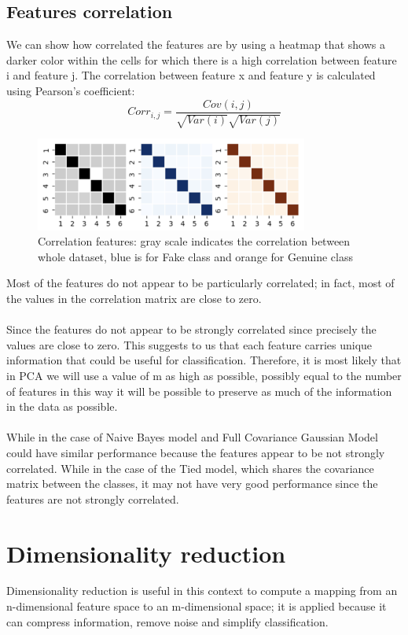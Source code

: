 \documentclass{article}
\begin{document}
\subsection{Features correlation}
We can show how correlated the features are by using a heatmap that shows a darker color within the cells for which there is a high correlation between feature i and feature j. The correlation between feature x and feature y is calculated using Pearson's coefficient:
\begin{equation}
    Corr_{i,j} = \frac{Cov(i,j)}{\sqrt{Var(i)}\sqrt{Var(j)}}  
\end{equation}
\begin{figure}[H]
    \centering
    \includegraphics[width=0.8\textwidth]{./img/correlazione.png}
    \caption{Correlation features: gray scale indicates the correlation between whole dataset, blue is for Fake class and orange for Genuine class}
    \label{fig:AllFeatures}
\end{figure} 
Most of the features do not appear to be particularly correlated; in fact, most of the values in the correlation matrix are close to zero.\\
\\
Since the features do not appear to be strongly correlated since precisely the values are close to zero. This suggests to us that each feature carries unique information that could be useful for classification. Therefore, it is most likely that in PCA we will use a value of m as high as possible, possibly equal to the number of features in this way it will be possible to preserve as much of the information in the data as possible.\\
\\
While in the case of Naive Bayes model and Full Covariance Gaussian Model could have similar performance because the features appear to be not strongly correlated. While in the case of the Tied model, which shares the covariance matrix between the classes, it may not have very good performance since the features are not strongly correlated.

\section{Dimensionality reduction}
Dimensionality reduction is useful in this context to compute a mapping from an n-dimensional feature space to an m-dimensional space; it is applied because it can compress information, remove noise and simplify classification.
\end{document}
